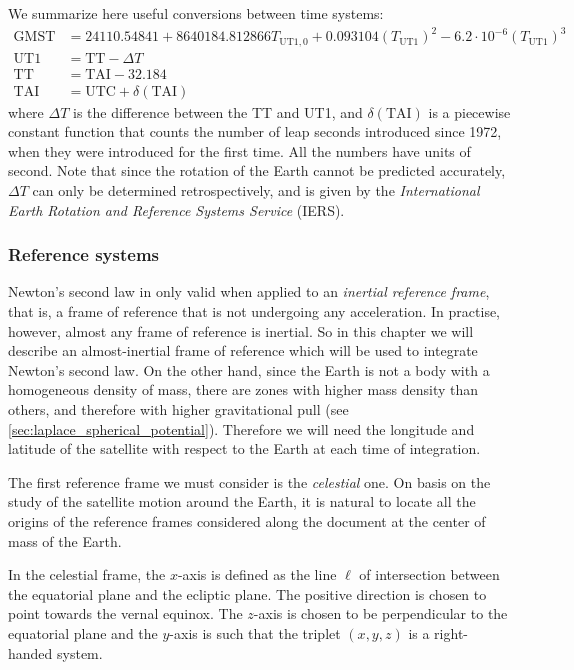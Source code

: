 \documentclass[../main.tex]{subfiles}
\begin{document}
We summarize here useful conversions between time systems:
\begin{align*}
  \text{GMST} & =24110.54841+8640184.812866{T_{\text{UT1},0}}+0.093104{(T_\text{UT1})}^2-6.2\cdot 10^{-6}{(T_\text{UT1})}^3 \\
  \text{UT1}  & =\text{TT}-\Delta T                                                                                         \\
  \text{TT}   & =\text{TAI}-32.184                                                                                          \\
  \text{TAI}  & =\text{UTC}+\delta(\text{TAI})
\end{align*}
where $\Delta T$ is the difference between the TT and UT1, and $\delta(\text{TAI})$ is a piecewise constant function that counts the number of leap seconds introduced since 1972, when they were introduced for the first time. All the numbers have units of second. Note that since the rotation of the Earth cannot be predicted accurately, $\Delta T$ can only be determined retrospectively, and is given by the \emph{International Earth Rotation and Reference Systems Service} (IERS).
\subsubsection{Reference systems}\label{sec:reference_systems}
Newton's second law in only valid when applied to an \emph{inertial reference frame}, that is, a frame of reference that is not undergoing any acceleration. In practise, however, almost any frame of reference is inertial. So in this chapter we will describe an almost-inertial frame of reference which will be used to integrate Newton's second law. On the other hand, since the Earth is not a body with a homogeneous density of mass, there are zones with higher mass density than others, and therefore with higher gravitational pull (see \cref{sec:laplace_spherical_potential}). Therefore we will need the longitude and latitude of the satellite with respect to the Earth at each time of integration.

The first reference frame we must consider is the \emph{celestial} one. On basis on the study of the satellite motion around the Earth, it is natural to locate all the origins of the reference frames considered along the document at the center of mass of the Earth.

In the celestial frame, the $x$-axis is defined as the line $\ell$ of intersection between the equatorial plane and the ecliptic plane. The positive direction is chosen to point towards the vernal equinox. The $z$-axis is chosen to be perpendicular to the equatorial plane and the $y$-axis is such that the triplet $(x,y,z)$ is a right-handed system.
\end{document}

